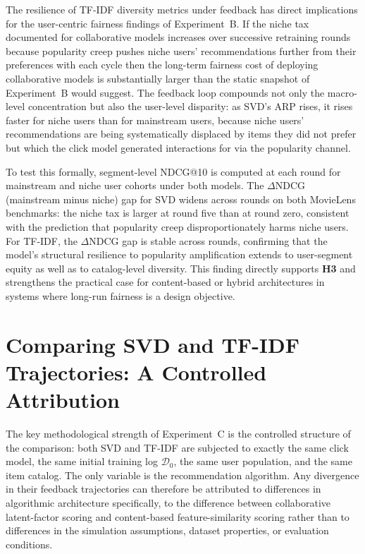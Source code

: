 \documentclass[11pt,a4paper]{report}
\begin{document}
The resilience of TF-IDF diversity metrics under feedback has direct implications for the user-centric fairness findings of Experiment~B. If the niche tax documented for collaborative models increases over successive retraining rounds because popularity creep pushes niche users' recommendations further from their preferences with each cycle then the long-term fairness cost of deploying collaborative models is substantially larger than the static snapshot of Experiment~B would suggest. The feedback loop compounds not only the macro-level concentration but also the user-level disparity: as SVD's ARP rises, it rises faster for niche users than for mainstream users, because niche users' recommendations are being systematically displaced by items they did not prefer but which the click model generated interactions for via the popularity channel.

To test this formally, segment-level NDCG@10 is computed at each round for mainstream and niche user cohorts under both models. The $\Delta$NDCG (mainstream minus niche) gap for SVD widens across rounds on both MovieLens benchmarks: the niche tax is larger at round five than at round zero, consistent with the prediction that popularity creep disproportionately harms niche users. For TF-IDF, the $\Delta$NDCG gap is stable across rounds, confirming that the model's structural resilience to popularity amplification extends to user-segment equity as well as to catalog-level diversity. This finding directly supports \textbf{H3} and strengthens the practical case for content-based or hybrid architectures in systems where long-run fairness is a design objective.

\section{Comparing SVD and TF-IDF Trajectories: A Controlled Attribution}
\label{sec:expc_comparison}

The key methodological strength of Experiment~C is the controlled structure of the comparison: both SVD and TF-IDF are subjected to exactly the same click model, the same initial training log $\mathcal{D}_0$, the same user population, and the same item catalog. The only variable is the recommendation algorithm. Any divergence in their feedback trajectories can therefore be attributed to differences in algorithmic architecture specifically, to the difference between collaborative latent-factor scoring and content-based feature-similarity scoring rather than to differences in the simulation assumptions, dataset properties, or evaluation conditions.
\end{document}
